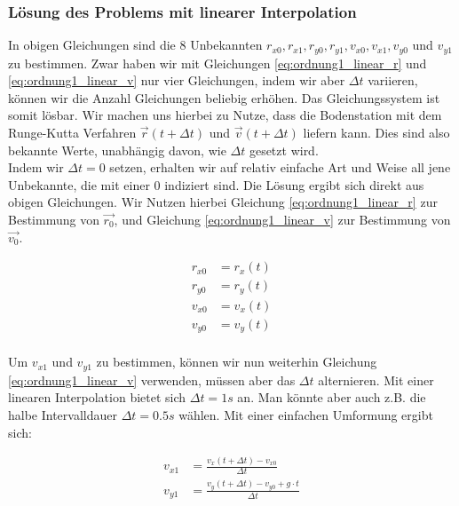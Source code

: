 \subsubsection{Lösung des Problems mit linearer Interpolation}\label{section:perturbation_ordnung1_linear}

In obigen Gleichungen sind die 8 Unbekannten $r_{x0}, r_{x1}, r_{y0}, r_{y1}, v_{x0}, v_{x1}, v_{y0}$ und $v_{y1}$ zu bestimmen. Zwar haben wir mit Gleichungen \ref{eq:ordnung1_linear_r} und \ref{eq:ordnung1_linear_v} nur vier Gleichungen, indem wir aber $\Delta t$ variieren, können wir die Anzahl Gleichungen beliebig erhöhen. Das Gleichungssystem ist somit lösbar. Wir machen uns hierbei zu Nutze, dass die Bodenstation mit dem Runge-Kutta Verfahren $\vec{r}(t + \Delta t)$ und $\vec{v}(t + \Delta t)$ liefern kann. Dies sind also bekannte Werte, unabhängig davon, wie $\Delta t$ gesetzt wird.\\

Indem wir $\Delta t = 0$ setzen, erhalten wir auf relativ einfache Art und Weise all jene Unbekannte, die mit einer $0$ indiziert sind. Die Lösung ergibt sich direkt aus obigen Gleichungen. Wir Nutzen hierbei Gleichung \eqref{eq:ordnung1_linear_r} zur Bestimmung von $\vec{r_0}$, und Gleichung \eqref{eq:ordnung1_linear_v} zur Bestimmung von $\vec{v_0}$.

\begin{equation}
\label{eq:ordnung1_linear_solutionPart1}
\begin{aligned}
r_{x0} &= r_x(t) \\
r_{y0} &= r_y(t) \\
v_{x0} &= v_x(t) \\
v_{y0} &= v_y(t) \\
\end{aligned}
\end{equation}

Um $v_{x1}$ und $v_{y1}$ zu bestimmen, können wir nun weiterhin Gleichung \ref{eq:ordnung1_linear_v} verwenden, müssen aber das $\Delta t$ alternieren. Mit einer linearen Interpolation bietet sich $\Delta t = 1s$ an. Man könnte aber auch z.B. die halbe Intervalldauer $\Delta t = 0.5s$ wählen. Mit einer einfachen Umformung ergibt sich:

\begin{equation}
\label{eq:ordnung1_linear_solutionPart2}
\begin{aligned}
v_{x1} &=  \frac{v_x(t + \Delta t) - v_{x0}}{\Delta t} \\
v_{y1} &=  \frac{v_y(t + \Delta t) - v_{y0} + g \cdot t}{\Delta t}
\end{aligned}
\end{equation}

